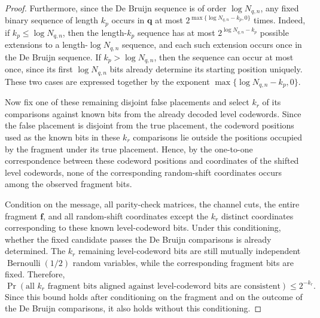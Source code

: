 \documentclass[10pt,a4paper]{amsart}
\newcommand{\boldf}{\mathbf{f}}
\newcommand{\boldq}{\mathbf{q}}
\begin{document}
\begin{proof}
Furthermore, since the De Bruijn sequence is of order
\(\log N_{q,n}\), any fixed binary sequence of length \(k_p\) occurs
in \(\boldq\) at most
\(2^{\max\{\log N_{q,n}-k_p,0\}}\) times.
Indeed, if \(k_p\leq\log N_{q,n}\), then the length-\(k_p\) sequence
has at most \(2^{\log N_{q,n}-k_p}\) possible extensions to a
length-\(\log N_{q,n}\) sequence, and each such extension occurs once
in the De Bruijn sequence. If \(k_p>\log N_{q,n}\), then the sequence
can occur at most once, since its first \(\log N_{q,n}\) bits already
determine its starting position uniquely. These two cases are expressed
together by the exponent
\(\max\{\log N_{q,n}-k_p,0\}\).

Now fix one of these remaining disjoint false placements and select
\(k_r\) of its comparisons against known bits from the already decoded
level codewords. Since the false placement is disjoint from the true
placement, the codeword positions used as the known bits in these
\(k_r\) comparisons lie outside the positions occupied by the fragment
under its true placement. Hence, by the one-to-one correspondence
between these codeword positions and coordinates of the shifted level
codewords, none of the corresponding random-shift coordinates occurs
among the observed fragment bits.


Condition on the message, all parity-check matrices, the channel cuts,
the entire fragment \(\boldf\), and all random-shift coordinates except
the \(k_r\) distinct coordinates corresponding to these known
level-codeword bits. Under this conditioning, whether the fixed
candidate passes the De Bruijn comparisons is already determined.
The \(k_r\) remaining level-codeword bits are still mutually independent
\(\operatorname{Bernoulli}(1/2)\) random variables, while the
corresponding fragment bits are fixed. Therefore,
\[
\Pr\left(
\text{all \(k_r\) fragment bits aligned against level-codeword bits are consistent}
\right)
\leq 2^{-k_r}.
\]
Since this bound holds after conditioning on the fragment and on the
outcome of the De Bruijn comparisons, it also holds without this
conditioning.


\end{proof}
\end{document}
